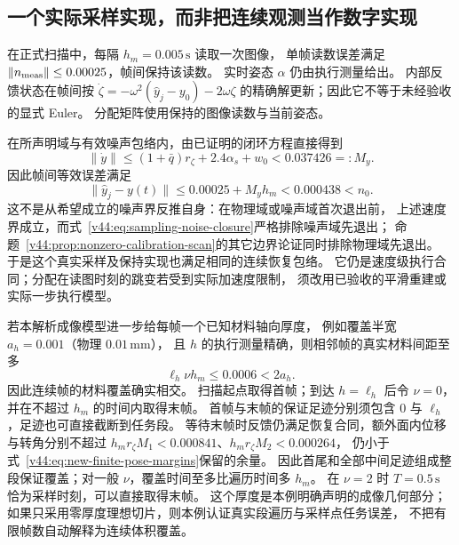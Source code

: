 \documentclass[11pt,a4paper]{article}
\numberwithin{equation}{section}
\theoremstyle{definition}
\begin{document}
\subsection{一个实际采样实现，而非把连续观测当作数字实现}
在正式扫描中，每隔 $h_m=0.005\,\mathrm{s}$ 读取一次图像，
单帧读数误差满足 $\|n_{\rm meas}\|\le0.00025$，帧间保持该读数。
实时姿态 $\alpha$ 仍由执行测量给出。
内部反馈状态在帧间按
$\dot\zeta=-\omega^2(\widehat y_j-y_0)-2\omega\zeta$
的精确解更新；因此它不等于未经验收的显式 Euler。
分配矩阵使用保持的图像读数与当前姿态。

在所声明域与有效噪声包络内，由已证明的闭环方程直接得到
\begin{equation}
 \|\dot y\|\le(1+\bar q)r_\zeta+2.4\alpha_s+w_0
   <0.037426=:M_y.
\end{equation}
因此帧间等效误差满足
\begin{equation}
 \|\widehat y_j-y(t)\|
 \le0.00025+M_yh_m<0.000438<n_0.
 \label{v44:eq:sampling-noise-closure}
\end{equation}
这不是从希望成立的噪声界反推自身：在物理域或噪声域首次退出前，
上述速度界成立，而式~\eqref{v44:eq:sampling-noise-closure}严格排除噪声域先退出；
命题~\ref{v44:prop:nonzero-calibration-scan}的其它边界论证同时排除物理域先退出。
于是这个真实采样及保持实现也满足相同的连续恢复包络。
它仍是速度级执行合同；分配在读图时刻的跳变若受到实际加速度限制，
须改用已验收的平滑重建或实际一步执行模型。

若本解析成像模型进一步给每帧一个已知材料轴向厚度，
例如覆盖半宽 $a_h=0.001$（物理 $0.01\,\mathrm{mm}$），
且 $h$ 的执行测量精确，则相邻帧的真实材料间距至多
\begin{equation}
 \ell_h\nu h_m\le0.0006<2a_h.
\end{equation}
因此连续帧的材料覆盖确实相交。
扫描起点取得首帧；到达 $h=\ell_h$ 后令 $\nu=0$，并在不超过 $h_m$ 的时间内取得末帧。
首帧与末帧的保证足迹分别须包含 $0$ 与 $\ell_h$，足迹也可直接截断到任务段。
等待末帧时反馈仍满足恢复合同，额外面内位移与转角分别不超过
$h_mr_\zeta M_1<0.000841$、$h_mr_\zeta M_2<0.000264$，
仍小于式~\eqref{v44:eq:new-finite-pose-margins}保留的余量。
因此首尾和全部中间足迹组成整段保证覆盖；对一般 $\nu$，覆盖时间至多比遍历时间多 $h_m$。
在 $\nu=2$ 时 $T=0.5\,\mathrm{s}$ 恰为采样时刻，可以直接取得末帧。
这个厚度是本例明确声明的成像几何部分；
如果只采用零厚度理想切片，则本例认证真实段遍历与采样点任务误差，
不把有限帧数自动解释为连续体积覆盖。
\end{document}
